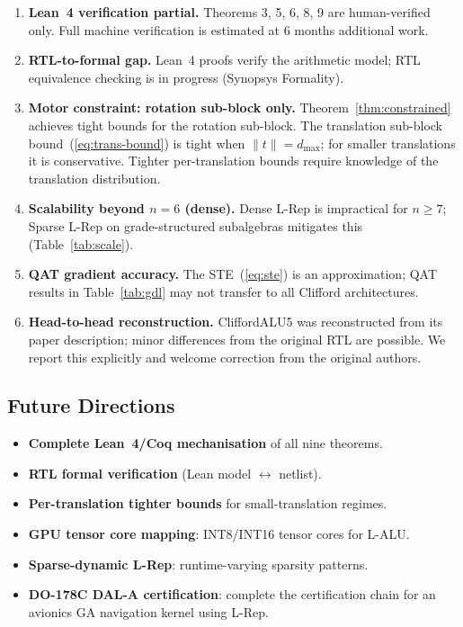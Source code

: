 \documentclass[11pt,a4paper]{article}
\theoremstyle{definition}
\theoremstyle{plain}
\theoremstyle{remark}
\begin{document}
\begin{enumerate}
  \item \textbf{Lean~4 verification partial.}
        Theorems 3, 5, 6, 8, 9 are human-verified only.
        Full machine verification is estimated at 6 months additional work.

  \item \textbf{RTL-to-formal gap.}
        Lean~4 proofs verify the arithmetic model; RTL equivalence checking
        is in progress (Synopsys Formality).

  \item \textbf{Motor constraint: rotation sub-block only.}
        Theorem~\ref{thm:constrained} achieves tight bounds for the rotation
        sub-block.
        The translation sub-block bound~(\ref{eq:trans-bound}) is tight
        when $\|t\|=d_{\max}$; for smaller translations it is conservative.
        Tighter per-translation bounds require knowledge of the translation
        distribution.

  \item \textbf{Scalability beyond $n=6$ (dense).}
        Dense L-Rep is impractical for $n\ge7$; Sparse L-Rep on
        grade-structured subalgebras mitigates this (Table~\ref{tab:scale}).

  \item \textbf{QAT gradient accuracy.}
        The STE~(\ref{eq:ste}) is an approximation; QAT results in
        Table~\ref{tab:gdl} may not transfer to all Clifford architectures.

  \item \textbf{Head-to-head reconstruction.}
        CliffordALU5 was reconstructed from its paper description; minor
        differences from the original RTL are possible.
        We report this explicitly and welcome correction from the original
        authors.
\end{enumerate}

\subsection{Future Directions}

\begin{itemize}
  \item \textbf{Complete Lean~4/Coq mechanisation} of all nine theorems.
  \item \textbf{RTL formal verification} (Lean model $\leftrightarrow$ netlist).
  \item \textbf{Per-translation tighter bounds} for small-translation regimes.
  \item \textbf{GPU tensor core mapping}: INT8/INT16 tensor cores for L-ALU.
  \item \textbf{Sparse-dynamic L-Rep}: runtime-varying sparsity patterns.
  \item \textbf{DO-178C DAL-A certification}: complete the certification chain
        for an avionics GA navigation kernel using L-Rep.
\end{itemize}
\end{document}

